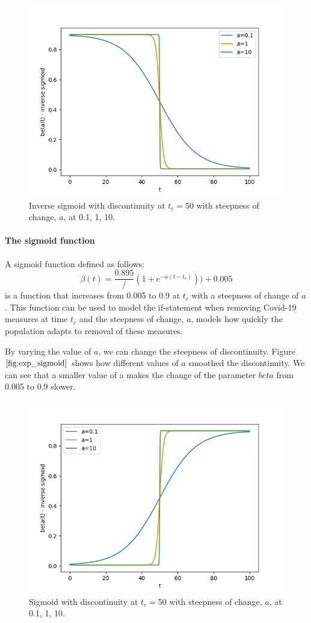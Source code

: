 \begin{figure}[H]
\centering
\includegraphics[width=0.7\linewidth]{./figures/exp_inverse_sigmoid}
\caption{Inverse sigmoid with discontinuity at $t_c=50$ with steepness of change, $a$, at 0.1, 1, 10.}
\label{fig:exp_inverse_sigmoid}
\end{figure}

\paragraph{The sigmoid function}
A sigmoid function defined as follows:
\begin{equation}
    \beta(t) = \frac{0.895}/{(1 + e^{-a(t - t_c)}))} + 0.005
\end{equation}
is a function that increases from 0.005 to 0.9 at $t_c$ with a steepness of change of $a$.
This function can be used to model the if-statement when removing Covid-19 measures at time $t_c$ and the steepness of change, $a$, models how quickly the population adapts to removal of these measures.

By varying the value of $a$, we can change the steepness of discontinuity. Figure $\ref{fig:exp_sigmoid}$ shows how different values of $a$ smoothed the discontinuity. We can see that a smaller value of a makes the change of the parameter $beta$ from 0.005 to 0.9 slower.

\begin{figure}[H]
\centering
\includegraphics[width=0.7\linewidth]{./figures/exp_sigmoid}
\caption{Sigmoid with discontinuity at $t_c=50$ with steepness of change, $a$, at 0.1, 1, 10.}
\label{fig:exp_sigmoid}
\end{figure}

